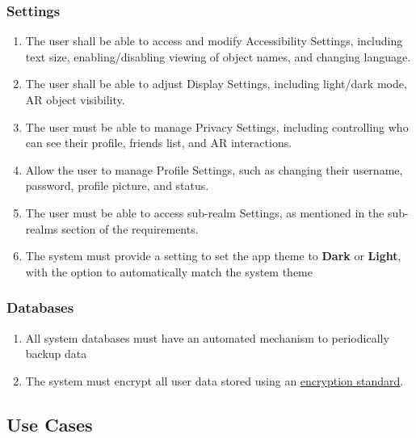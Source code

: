 \documentclass{article}
\begin{document}
\subsubsection{Settings}
\label{ssub:settings}
\begin{enumerate}[align=left, label=\textbf{S-FR\arabic*:}]
    \item The user shall be able to access and modify Accessibility Settings, including text size, enabling/disabling viewing of object names, and changing language.
    \item The user shall be able to adjust Display Settings, including light/dark mode, AR object visibility.
    \item The user must be able to manage Privacy Settings, including controlling who can see their profile, friends list, and AR interactions.
    \item Allow the user to manage Profile Settings, such as changing their username, password, profile picture, and status.
    \item The user must be able to access sub-realm Settings, as mentioned in the sub-realms section of the requirements.
    \item The system must provide a setting to set the app theme to \textbf{Dark} or \textbf{Light}, with the option to automatically match the system theme \\
\end{enumerate}

\subsubsection{Databases}

\begin{enumerate}[align=left, label=\textbf{DB-FR\arabic*:}]
    \item All system databases must have an automated mechanism to periodically backup data \\
    \item The system must encrypt all user data stored using an \hyperref[def:encryption_standard]{encryption standard}. \\
\end{enumerate}

\subsection{Use Cases}
\label{sub:use_cases}
\end{document}
